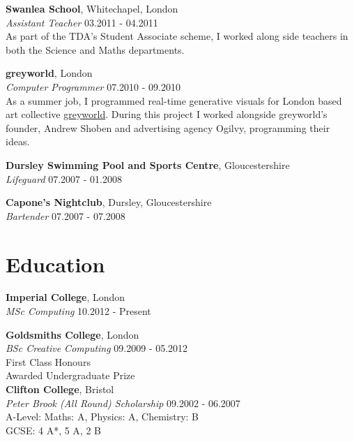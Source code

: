 \documentclass[margin,line,a4paper]{resume}
\begin{document}
\begin{resume}
\textbf{Swanlea School}, Whitechapel, London \vspace{1mm}\\
\textsl{Assistant Teacher} \hfill 03.2011 - 04.2011 \vspace{2mm} \\
As part of the TDA’s Student Associate scheme, I worked along side teachers in both the Science and Maths departments.

\textbf{greyworld}, London  \vspace{1mm}\\
\textsl{Computer Programmer} \hfill 07.2010 - 09.2010 \vspace{2mm} \\
As a summer job, I programmed real-time generative visuals for London based art collective \href{http://greyworld.org}{greyworld}. During this project I worked alongside greyworld's founder, Andrew Shoben and advertising agency Ogilvy, programming their ideas.

\textbf{Dursley Swimming Pool and Sports Centre}, Gloucestershire  \vspace{1mm}\\
\textsl{Lifeguard} \hfill 07.2007 - 01.2008

\textbf{Capone's Nightclub}, Dursley, Gloucestershire  \vspace{1mm}\\
\textsl{Bartender} \hfill 07.2007 - 07.2008 \vspace{2mm} \\

\section{\mysidestyle Education}

\textbf{Imperial College}, London \vspace{1mm}\\
\textsl{MSc Computing} \hfill 10.2012 - Present

\textbf{Goldsmiths College}, London \vspace{1mm}\\
\textsl{BSc Creative Computing} \hfill 09.2009 - 05.2012 \vspace{2mm} \\
First Class Honours \\
Awarded Undergraduate Prize \\

\textbf{Clifton College}, Bristol \vspace{1mm}\\
\textsl{Peter Brook (All Round) Scholarship} \hfill 09.2002 - 06.2007 \vspace{2mm} \\
A-Level: Maths: A, Physics: A, Chemistry: B \\
GCSE: 4 A*, 5 A, 2 B \\



\end{resume}
\end{document}
